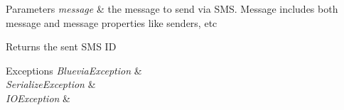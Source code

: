 \begin{DoxyParams}{Parameters}
{\em message} & the message to send via SMS. Message includes both message and message properties like senders, etc \\
\hline
\end{DoxyParams}
\begin{DoxyReturn}{Returns}
the sent SMS ID 
\end{DoxyReturn}

\begin{DoxyExceptions}{Exceptions}
{\em BlueviaException} & \\
\hline
{\em SerializeException} & \\
\hline
{\em IOException} & \\
\hline
\end{DoxyExceptions}
